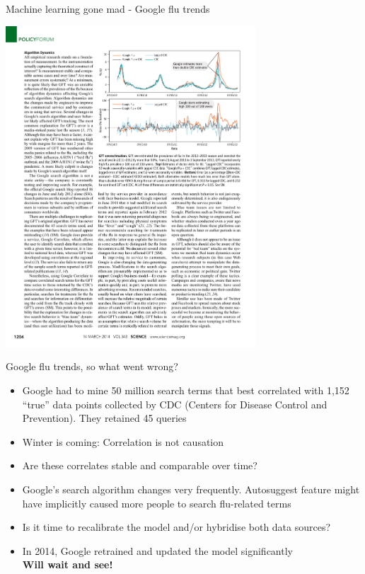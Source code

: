 \documentclass[pdf]{beamer}
\begin{document}
\begin{frame}{Machine learning gone mad - Google flu trends}
\begin{center}
		\includegraphics[width=0.7\textwidth]{googleFluTrend3.pdf}
\end{center}
\end{frame}
\begin{frame}{Google flu trends, so what went wrong?}
\begin{itemize}\addtolength{\itemsep}{0.5\baselineskip}
	\item<1-> Google had to mine 50 million search terms that best correlated with 1,152 ``true'' data points 
	collected by CDC (Centers for Disease Control and Prevention). They retained 45 queries 
	\item<2-> Winter is coming: Correlation is not causation
	\item<3-> Are these correlates stable and comparable over time?
	\item<4-> Google's search algorithm changes very frequently. Autosuggest feature might have implicitly 
	caused more people to search flu-related terms 
	\item<5-> Is it time to recalibrate the model and/or hybridise both data sources?
	\item<6-> In 2014, Google retrained and updated the model significantly\\ 
	\textbf{Will wait and see!}
\end{itemize}
\end{frame}
\end{document}
